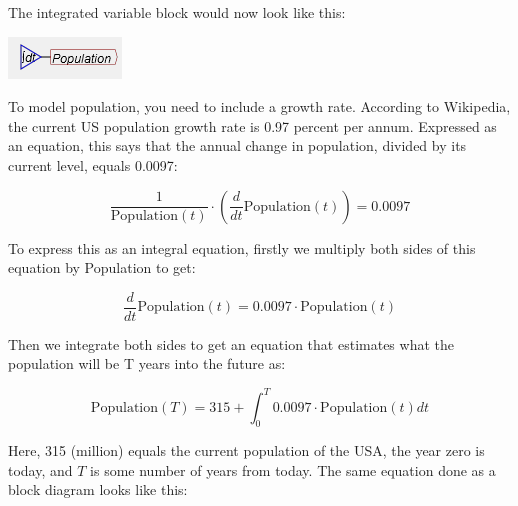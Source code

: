\begin{description}
The integrated variable block would now look like this:
\begin{center}
\includegraphics{images/NewItem42} 
\par\end{center}

To model population, you need to include a growth rate. According
to Wikipedia, the current US population growth rate is 0.97 percent
per annum. Expressed as an equation, this says that the annual change
in population, divided by its current level, equals 0.0097:

\[
\frac{1}{\mathrm{Population}(t)}\cdot\left(\frac{d}{dt}\mathrm{Population}(t)\right)=0.0097
\]

To express this as an integral equation, firstly we multiply both
sides of this equation by Population to get:

\[
\frac{d}{dt}\mathrm{Population}(t)=0.0097\cdot\mathrm{Population}(t)
\]

Then we integrate both sides to get an equation that estimates what
the population will be T years into the future as:

\[
\mathrm{Population}(T)=315+\int_{0}^{T}0.0097\cdot\mathrm{Population}(t)dt
\]

Here, 315 (million) equals the current population of the USA, the
year zero is today, and $T$ is some number of years from today. The
same equation done as a block diagram looks like this:
\begin{center}
\par\end{center}


\end{description}
